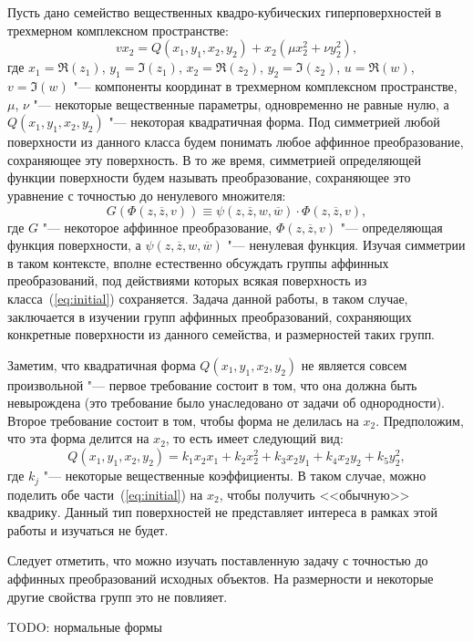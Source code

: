 \documentclass[../main.tex]{subfiles}
\begin{document}
Пусть дано семейство вещественных квадро-кубических гиперповерхностей в трехмерном комплексном пространстве:
\begin{equation}\label{eq:initial}
v x_2 = Q(x_1, y_1, x_2, y_2) + x_2 (\mu x_2^2 + \nu y_2^2),
\end{equation}
где $x_1 = \Re(z_1)$, $y_1 = \Im(z_1)$, $x_2 = \Re(z_2)$, $y_2 = \Im(z_2)$, $u = \Re(w)$, $v= \Im(w)$ "--- компоненты координат в трехмерном комплексном пространстве, $\mu$, $\nu$ "--- некоторые вещественные параметры, одновременно не равные нулю, а $Q(x_1, y_1, x_2, y_2)$ "--- некоторая квадратичная форма. Под симметрией любой поверхности из данного класса будем понимать любое аффинное преобразование, сохраняющее эту поверхность. В то же время, симметрией определяющей функции поверхности будем называть преобразование, сохраняющее это уравнение с точностью до ненулевого множителя:
\begin{equation}\label{eq:preservation}
G(\Phi(z, \overline{z}, v)) \equiv \psi(z, \overline{z}, w, \overline{w}) \cdot \Phi(z, \overline{z}, v),
\end{equation}
где $G$ "--- некоторое аффинное преобразование, $\Phi(z, \overline z, v)$ "--- определяющая функция поверхности, а $\psi(z, \overline z, w, \overline w)$ "--- ненулевая функция. Изучая симметрии в таком контексте, вполне естественно обсуждать группы аффинных преобразований, под действиями которых всякая поверхность из класса~(\ref{eq:initial}) сохраняется. Задача данной работы, в таком случае, заключается в изучении групп аффинных преобразований, сохраняющих конкретные поверхности из данного семейства, и размерностей таких групп. 

Заметим, что квадратичная форма $Q(x_1, y_1, x_2, y_2)$ не является совсем произвольной "--- первое требование состоит в том, что она должна быть невырождена  (это требование было унаследовано от задачи об однородности). Второе требование состоит в том, чтобы форма не делилась на $x_2$. Предположим, что эта форма делится на $x_2$, то есть имеет следующий вид:
\begin{equation*}
Q(x_1, y_1, x_2, y_2) = k_1 x_2 x_1 + k_2 x_2^2 + k_3 x_2 y_1 + k_4 x_2 y_2 + k_{5} y_2^2,
\end{equation*}
где $k_j$ "--- некоторые вещественные коэффициенты. В таком случае, можно поделить обе части~(\ref{eq:initial}) на $x_2$, чтобы получить <<обычную>> квадрику. Данный тип поверхностей не представляет интереса в рамках этой работы и изучаться не будет. 

Следует отметить, что можно изучать поставленную задачу с точностью до аффинных преобразований исходных объектов. На размерности и некоторые другие свойства групп это не повлияет.

TODO: нормальные формы
\end{document}
